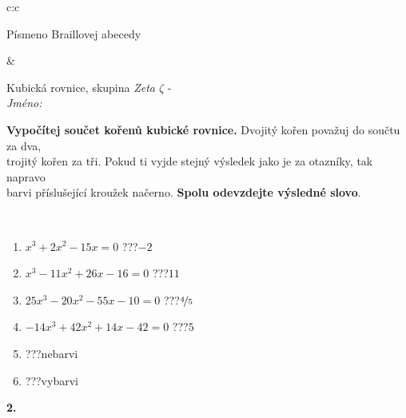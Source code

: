 \documentclass[10pt]{report}
\begin{document}
\begin{tabular}{c:c}
\begin{minipage}[c][104.5mm][t]{0.5\linewidth}
\begin{center}
\begin{minipage}{0.20\linewidth}
\begin{center}
{\small Písmeno Braillovej abecedy}
\end{center}
\end{minipage}
\end{center}
\end{minipage}
&
\begin{minipage}[c][104.5mm][t]{0.5\linewidth}
\begin{center}
\vspace{7mm}
{\huge Kubická rovnice, skupina \textit{Zeta $\zeta$} -}\\[5mm]
\textit{Jméno:}\phantom{xxxxxxxxxxxxxxxxxxxxxxxxxxxxxxxxxxxxxxxxxxxxxxxxxxxxxxxxxxxxxxxxx}\\[5mm]
\begin{minipage}{0.95\linewidth}
\begin{center}
\textbf{Vypočítej součet kořenů kubické rovnice.} Dvojitý kořen považuj do součtu za dva,\\trojitý kořen za tři. Pokud ti vyjde stejný výsledek jako je za otazníky, tak napravo\\barvi příslušející kroužek načerno. \textbf{Spolu odevzdejte výsledné slovo}.
\end{center}
\end{minipage}
\\[1mm]
\begin{minipage}{0.79\linewidth}
\begin{center}
\begin{varwidth}{\linewidth}
\begin{enumerate}
\Large
\item $x^3+2x^2-15x=0$\quad \dotfill\; ???\;\dotfill \quad $-2$
\item $x^3-11x^2+26x-16=0$\quad \dotfill\; ???\;\dotfill \quad $11$
\item $25x^3-20x^2-55x-10=0$\quad \dotfill\; ???\;\dotfill \quad $\nicefrac{4}{5}$
\item $-14x^3+42x^2+14x-42=0$\quad \dotfill\; ???\;\dotfill \quad $5$
\item \quad \dotfill\; ???\;\dotfill \quad nebarvi
\item \quad \dotfill\; ???\;\dotfill \quad vybarvi
\end{enumerate}
\end{varwidth}
\end{center}
\end{minipage}
\begin{minipage}{0.20\linewidth}
\begin{center}
{\Huge\bfseries 2.} \\[2mm]

\end{center}
\end{minipage}
\end{center}
\end{minipage}
\end{tabular}
\end{document}
